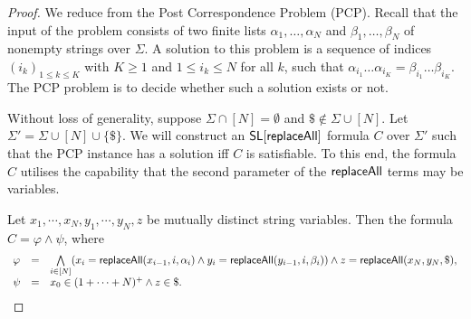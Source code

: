 \begin{proof}
	We reduce from the Post Correspondence Problem (PCP). Recall that the input of the problem consists of two finite lists $\alpha_{1},\ldots ,\alpha_{N}$ and $\beta_1,\ldots ,\beta_N$ of nonempty strings over $\Sigma$. A solution to this problem is a sequence of indices $(i_{k})_{1\leq k\leq K}$ with $ K\geq 1$ and $ 1\leq i_{k}\leq N$ for all $k$, such that
$	\alpha _{{i_{1}}}\ldots \alpha _{{i_{K}}}=\beta _{{i_{1}}}\ldots \beta _{{i_{K}}}.
$
	The PCP problem is to decide whether such a solution exists or not.

	Without loss of generality, suppose $\Sigma \cap [N] = \emptyset$ and $\$ \not \in \Sigma \cup [N]$. Let $\Sigma' = \Sigma \cup [N] \cup \{\$\}$. We will construct an $\mathsf{SL}[\mathsf{replaceAll}]$ formula $C$ over $\Sigma'$ such that the PCP instance has a solution iff $C$ is satisfiable. To this end, the formula $C$ utilises the capability that the second parameter of the $\mathsf{replaceAll}$ terms may be variables.
	
	Let $x_1, \cdots, x_N, y_1, \cdots, y_N, z$ be mutually distinct string variables. Then the formula $C = \varphi \wedge \psi$, where 
%
$$
\begin{array}{l c l}
\varphi & = & \bigwedge \limits_{i \in [N]} (x_i = \mathsf{replaceAll}(x_{i-1}, i, \alpha_i) \wedge y_i = \mathsf{replaceAll}(y_{i-1}, i, \beta_i)) \wedge  z = \mathsf{replaceAll}(x_N, y_N, \$), \\
\psi & = & x_0 \in (1 + \cdots + N)^+ \wedge z \in \$.
\end{array}
$$


\end{proof}

